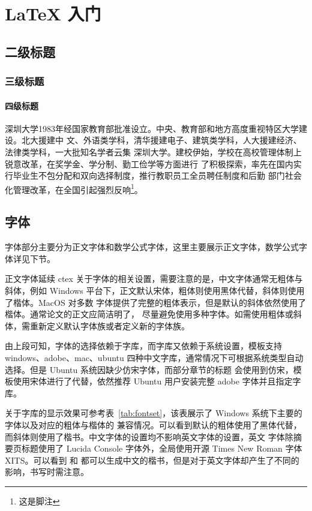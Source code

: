 \chapter{\LaTeX{} 入门}
\section{二级标题}

\subsection{三级标题}

\subsubsection{四级标题}

深圳大学1983年经国家教育部批准设立。中央、教育部和地方高度重视特区大学建设。北大援建中
文、外语类学科，清华援建电子、建筑类学科，人大援建经济、法律类学科，一大批知名学者云集
深圳大学。建校伊始，学校在高校管理体制上锐意改革，在奖学金、学分制、勤工俭学等方面进行
了积极探索，率先在国内实行毕业生不包分配和双向选择制度，推行教职员工全员聘任制度和后勤
部门社会化管理改革，在全国引起强烈反响\footnote{这是脚注}。

\section{字体}

字体部分主要分为正文字体和数学公式字体，这里主要展示正文字体，数学公式字体详见下节。

正文字体延续 ctex 关于字体的相关设置，需要注意的是，中文字体通常无粗体与斜体，例如
Windows 平台下，正文默认宋体，粗体则使用黑体代替，斜体则使用了楷体。MacOS 对多数
字体提供了完整的粗体表示，但是默认的斜体依然使用了楷体。通常论文的正文应简洁明了，
尽量避免使用多种字体。如需使用粗体或斜体，需重新定义默认字体族或者定义新的字体族。

由上段可知，字体的选择依赖于字库，而字库又依赖于系统设置，模板支持windows、adobe、mac、ubuntu
四种中文字库，通常情况下可根据系统类型自动选择。但是 Ubuntu 系统因缺少仿宋字体，而部分章节的标题
会使用到仿宋，模板使用宋体进行了代替，依然推荐 Ubuntu 用户安装完整 adobe 字体并且指定字库。

关于字库的显示效果可参考表~\ref{tab:fontset}，该表展示了 Windows 系统下主要的字体以及对应的粗体与楷体的
兼容情况。可以看到默认的粗体使用了黑体代替，而斜体则使用了楷书。中文字体的设置均不影响英文字体的设置，英文
字体除摘要页标题使用了 Lucida Console 字体外，全局使用开源 Times New Roman 字体 XITS。可以看到 
和  都可以生成中文的楷书，但是对于英文字体却产生了不同的影响，书写时需注意。

